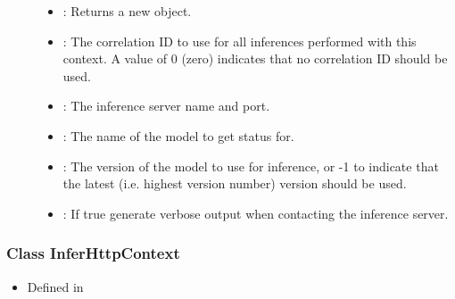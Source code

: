 \documentclass[letterpaper,10pt,english]{sphinxmanual}
\begin{document}
\begin{fulllineitems}
\begin{fulllineitems}
\begin{description}
\item[{}] \leavevmode\begin{itemize}
\item {} 
: Returns a new {\hyperref[\detokenize{cpp_api/classnvidia_1_1inferenceserver_1_1client_1_1InferGrpcContext:classnvidia_1_1inferenceserver_1_1client_1_1InferGrpcContext}]{}} object. 

\item {} 
: The correlation ID to use for all inferences performed with this context. A value of 0 (zero) indicates that no correlation ID should be used. 

\item {} 
: The inference server name and port. 

\item {} 
: The name of the model to get status for. 

\item {} 
: The version of the model to use for inference, or -1 to indicate that the latest (i.e. highest version number) version should be used. 

\item {} 
: If true generate verbose output when contacting the inference server. 

\end{itemize}

\end{description}


\end{fulllineitems}


\end{fulllineitems}



\subsubsection{Class InferHttpContext}
\label{\detokenize{cpp_api/classnvidia_1_1inferenceserver_1_1client_1_1InferHttpContext:class-inferhttpcontext}}\label{\detokenize{cpp_api/classnvidia_1_1inferenceserver_1_1client_1_1InferHttpContext:exhale-class-classnvidia-1-1inferenceserver-1-1client-1-1inferhttpcontext}}\label{\detokenize{cpp_api/classnvidia_1_1inferenceserver_1_1client_1_1InferHttpContext::doc}}\begin{itemize}
\item {} 
Defined in {\hyperref[\detokenize{cpp_api/file_src_clients_c++_request.h:file-src-clients-c-request-h}]{}}

\end{itemize}
\end{document}
